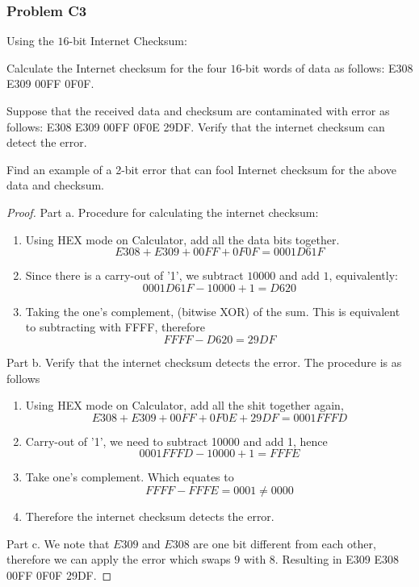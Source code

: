 \documentclass[../../../main.tex]{subfiles}
\begin{document}
\subsubsection{Problem C3}
\begin{wts}
    Using the $16$-bit Internet Checksum:
    \begin{enumalpha}
        \item Calculate the Internet checksum for the four $16$-bit words of data as follows: E308 E309 00FF 0F0F.
        \item Suppose that the received data and checksum are contaminated with error as follows: E308 E309 00FF 0F0E 29DF. Verify that the internet checksum can detect the error.
        \item Find an example of a 2-bit error that can fool Internet checksum for the above data and checksum.
    \end{enumalpha}
\end{wts}
\begin{proof}
Part a. Procedure for calculating the internet checksum:
\begin{enumerate}
    \item Using HEX mode on Calculator, add all the data bits together. 
    \[
    E308+E309+00FF+0F0F = 0001D61F
    \]
    \item Since there is a carry-out of '1', we subtract $10000$ and add $1$, equivalently:
    \[
    0001D61F - 10000 + 1 = D620
    \]
    \item Taking the one's complement, (bitwise XOR) of the sum. This is equivalent to subtracting with FFFF, therefore
    \[
    FFFF- D620 = 29DF
    \]
\end{enumerate}
Part b. Verify that the internet checksum detects the error. The procedure is as follows
\begin{enumerate}
    \item Using HEX mode on Calculator, add all the shit together again,
    \[
    E308+E309+00FF+0F0E+29DF = 0001FFFD
    \]
    \item Carry-out of '1', we need to subtract 10000 and add 1, hence
    \[
    0001FFFD - 10000 + 1 = FFFE
    \]
    \item Take one's complement. Which equates to
    \[
    FFFF-FFFE = 0001 \neq 0000
    \]
    \item Therefore the internet checksum detects the error.
\end{enumerate}
Part c. We note that $E309$ and $E308$ are one bit different from each other, therefore we can apply the error which swaps $9$ with $8$. Resulting in E309 E308 00FF 0F0F 29DF.

\end{proof}
\end{document}
